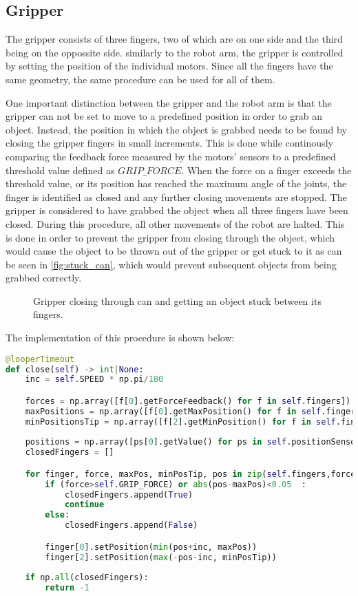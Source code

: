 \subsection{Gripper}

The gripper consists of three fingers, two of which are on one side and the third being on the oppossite side. similarly to the robot arm, the gripper is controlled by setting the position of the individual motors. Since all the fingers have the same geometry, the same procedure can be used for all of them. 

One important distinction between the gripper and the robot arm is that the gripper can not be set to move to a predefined position in order to grab an object. Instead, the position in which the object is grabbed needs to be found by closing the gripper fingers in small increments. This is done while continously comparing the feedback force measured by the motors' sensors to a predefined threshold value defined as \(GRIP\_FORCE\). When the force on a finger exceeds the threshold value, or its position has reached the maximum angle of the joints, the finger is identified as closed and any further closing movements are stopped. The gripper is considered to have grabbed the object when all three fingers have been closed. During this procedure, all other movements of the robot are halted.
This is done in order to prevent the gripper from closing through the object, which would cause the object to be thrown out of the gripper or get stuck to it as can be seen in \vref{fig:stuck_can}, which would prevent subsequent objects from being grabbed correctly.

\begin{figure}[!htb]
    \centering
    \caption{Gripper closing through can and getting an object stuck between its fingers.}
    \label{fig:stuck_can}
\end{figure}

The implementation of this procedure is shown below:

\begin{lstlisting}[language=python]
@looperTimeout
def close(self) -> int|None:
    inc = self.SPEED * np.pi/180

    forces = np.array([f[0].getForceFeedback() for f in self.fingers])
    maxPositions = np.array([f[0].getMaxPosition() for f in self.fingers])
    minPositionsTip = np.array([f[2].getMinPosition() for f in self.fingers])
    
    positions = np.array([ps[0].getValue() for ps in self.positionSensors])
    closedFingers = []

    for finger, force, maxPos, minPosTip, pos in zip(self.fingers,forces,maxPositions, minPositionsTip,positions): #
        if (force>self.GRIP_FORCE) or abs(pos-maxPos)<0.05  :
            closedFingers.append(True)
            continue
        else:
            closedFingers.append(False)

        finger[0].setPosition(min(pos+inc, maxPos))
        finger[2].setPosition(max(-pos-inc, minPosTip))
        
    if np.all(closedFingers):
        return -1    
\end{lstlisting}


